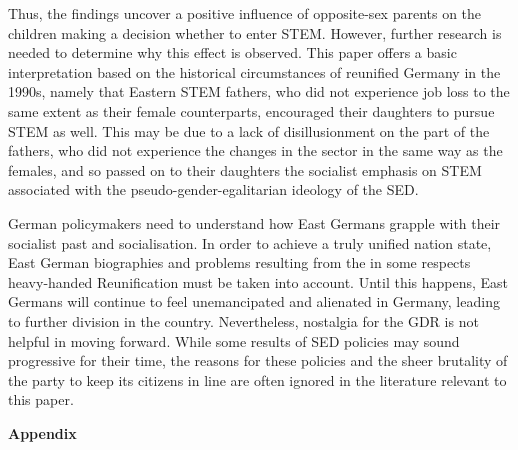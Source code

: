 \documentclass[a4paper, oneside, hyperfootnotes = false]{article}
\begin{document}
{Thus, the findings uncover a positive influence of opposite-sex parents on the children making a decision whether to enter STEM.
However, further research is needed to determine why this effect is observed.
This paper offers a basic interpretation based on the historical circumstances of reunified Germany in the 1990s, namely that Eastern STEM fathers, who did not experience job loss to the same extent as their female counterparts, encouraged their daughters to pursue STEM as well.
This may be due to a lack of disillusionment on the part of the fathers, who did not experience the changes in the sector in the same way as the females, and so passed on to their daughters the socialist emphasis on STEM associated with the pseudo-gender-egalitarian ideology of the SED.

German policymakers need to understand how East Germans grapple with their socialist past and socialisation.
In order to achieve a truly unified nation state, East German biographies and problems resulting from the in some respects heavy-handed Reunification must be taken into account.
Until this happens, East Germans will continue to feel unemancipated and alienated in Germany, leading to further division in the country.
Nevertheless, nostalgia for the GDR is not helpful in moving forward.
While some results of SED policies may sound progressive for their time, the reasons for these policies and the sheer brutality of the party to keep its citizens in line are often ignored in the literature relevant to this paper.

\vspace{4cm}

{}

\makeatletter %


\label{references}

\makeatother

\vspace{-.3cm}

\clearpage

{}
\mbox{} \vfill \centering \bfseries{{\Large Appendix}} \vfill \mbox{}
\label{appendix}

}%
\end{document}
